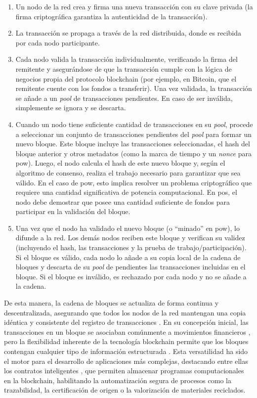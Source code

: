 \begin{enumerate}
    \item Un \gls{nodo} de la red crea y firma una nueva transacción con su clave privada (la firma criptográfica garantiza la autenticidad de la transacción).
    \item La transacción se propaga a través de la red distribuida, donde es recibida por cada nodo participante.
    \item Cada nodo valida la transacción individualmente, verificando la firma del remitente y asegurándose de que la transacción cumple con la lógica de negocios propia del protocolo blockchain (por ejemplo, en Bitcoin, que el remitente cuente con los fondos a transferir). Una vez validada, la transacción se añade a un \textit{pool} de transacciones pendientes. En caso de ser inválida, simplemente se ignora y se descarta. 
    \item Cuando un nodo tiene suficiente cantidad de transacciones en su \textit{pool}, procede a seleccionar un conjunto de transacciones pendientes del \textit{pool} para formar un nuevo bloque. Este bloque incluye las transacciones seleccionadas, el hash del bloque anterior y otros metadatos (como la marca de tiempo y un \textit{nonce} para \acrshort{pow}). Luego, el nodo calcula el hash de este nuevo bloque y, según el algoritmo de consenso, realiza el trabajo necesario para garantizar que sea válido. En el caso de \acrshort{pow}, esto implica resolver un problema criptográfico que requiere una cantidad significativa de potencia computacional. En \acrshort{pos}, el nodo debe demostrar que posee una cantidad suficiente de fondos para participar en la validación del bloque.
    \item Una vez que el nodo ha validado el nuevo bloque (o ``minado'' en \acrshort{pow}), lo difunde a la red. Los demás nodos reciben este bloque y verifican su validez (incluyendo el hash, las transacciones y la prueba de trabajo/participación). Si el bloque es válido, cada nodo lo añade a su copia local de la cadena de bloques y descarta de su \textit{pool} de pendientes las transacciones incluidas en el bloque. Si el bloque es inválido, es rechazado por cada nodo y no se añade a la cadena.
\end{enumerate}

De esta manera, la cadena de bloques se actualiza de forma continua y descentralizada, asegurando que todos los nodos de la red mantengan una copia idéntica y consistente del registro de transacciones \cite{bartolomeo2020introduccion}. En su concepción inicial, las transacciones en un bloque se asociaban comúnmente a movimientos financieros \cite{satoshi2008bitcoin}, pero la flexibilidad inherente de la tecnología blockchain permite que los bloques contengan cualquier tipo de información estructurada \cite{bartolomeo2020introduccion}. Esta versatilidad ha sido el motor para el desarrollo de aplicaciones más complejas, destacando entre ellas los contratos inteligentes \cite{sunny2022systematic}, que permiten almacenar programas computacionales en la blockchain, habilitando la automatización segura de procesos como la trazabilidad, la certificación de origen o la valorización de materiales reciclados.

